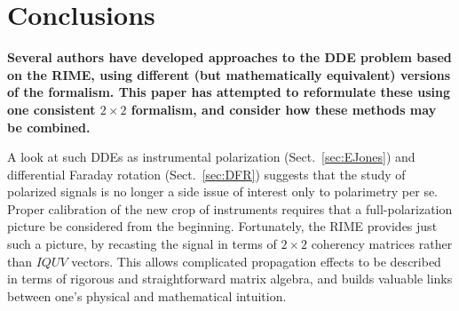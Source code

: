 \documentclass[referee]{aa}
\newcommand{\EDIT}[1]{{\bf #1}}
\begin{document}
\section{Conclusions}
\EDIT{
Several authors have developed approaches to the DDE problem based on the RIME, using different (but mathematically equivalent) versions of the formalism. This paper has attempted to reformulate these using one consistent $2\times2$ formalism, and consider how these methods may be combined. 

A look at such DDEs as instrumental polarization (Sect.~\ref{sec:EJones}) and differential Faraday rotation (Sect.~\ref{sec:DFR}) suggests that the study of polarized signals is no longer a side issue of interest only to polarimetry per se. Proper calibration of the new crop of instruments requires that a full-polarization picture be considered from the beginning. Fortunately, the RIME provides just such a picture, by recasting the signal in terms of $2\times2$ coherency matrices rather than $IQUV$ vectors. This allows complicated propagation effects to be described in terms of rigorous and straightforward matrix algebra, and builds valuable links between one's physical and mathematical intuition. 
}




\end{document}
